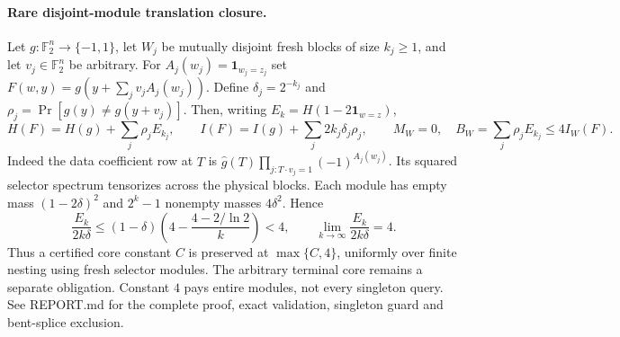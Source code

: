 \paragraph{Rare disjoint-module translation closure.}
Let $g:\mathbb F_2^n\to\{-1,1\}$, let $W_j$ be mutually disjoint fresh
blocks of size $k_j\ge1$, and let $v_j\in\mathbb F_2^n$ be arbitrary.
For $A_j(w_j)=\mathbf1_{w_j=z_j}$ set
$F(w,y)=g(y+\sum_jv_jA_j(w_j))$.
Define $\delta_j=2^{-k_j}$ and
$\rho_j=\Pr[g(y)\ne g(y+v_j)]$.
Then, writing $E_k=H(1-2\mathbf1_{w=z})$,
\[
 H(F)=H(g)+\sum_j\rho_jE_{k_j},\qquad
 I(F)=I(g)+\sum_j2k_j\delta_j\rho_j,
 \qquad M_W=0,\quad B_W=\sum_j\rho_jE_{k_j}\le4I_W(F).
\]
Indeed the data coefficient row at $T$ is
$\widehat g(T)\prod_{j:T\cdot v_j=1}(-1)^{A_j(w_j)}$.
Its squared selector spectrum tensorizes across the physical blocks.
Each module has empty mass $(1-2\delta)^2$ and $2^k-1$ nonempty masses
$4\delta^2$. Hence
\[
 \frac{E_k}{2k\delta}
 \le(1-\delta)\left(4-\frac{4-2/\ln2}{k}\right)<4,
 \qquad\lim_{k\to\infty}\frac{E_k}{2k\delta}=4.
\]
Thus a certified core constant $C$ is preserved at $\max\{C,4\}$,
uniformly over finite nesting using fresh selector modules. The arbitrary
terminal core remains a separate obligation. Constant $4$ pays entire
modules, not every singleton query. See REPORT.md for the complete proof,
exact validation, singleton guard and bent-splice exclusion.
